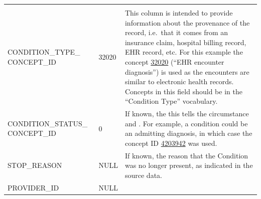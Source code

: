 \documentclass[11pt]{book}
\theoremstyle{definition}
\theoremstyle{definition}
\theoremstyle{definition}
\theoremstyle{remark}
\begin{document}
\begin{longtable}[]{@{}lll@{}}
\begin{minipage}[t]{0.49\columnwidth}
\end{minipage}\tabularnewline
\begin{minipage}[t]{0.28\columnwidth}\raggedright
CONDITION\_TYPE\_ CONCEPT\_ID\strut
\end{minipage} & \begin{minipage}[t]{0.15\columnwidth}\raggedright
32020\strut
\end{minipage} & \begin{minipage}[t]{0.49\columnwidth}\raggedright
This column is intended to provide information about the provenance of the record, i.e.~that it comes from an insurance claim, hospital billing record, EHR record, etc. For this example the concept \href{http://athena.ohdsi.org/search-terms/terms/32020}{32020} (``EHR encounter diagnosis'') is used as the encounters are similar to electronic health records. Concepts in this field should be in the ``Condition Type'' vocabulary.\strut
\end{minipage}\tabularnewline
\begin{minipage}[t]{0.28\columnwidth}\raggedright
CONDITION\_STATUS\_ CONCEPT\_ID\strut
\end{minipage} & \begin{minipage}[t]{0.15\columnwidth}\raggedright
0\strut
\end{minipage} & \begin{minipage}[t]{0.49\columnwidth}\raggedright
If known, the this tells the circumstance and . For example, a condition could be an admitting diagnosis, in which case the concept ID \href{http://athena.ohdsi.org/search-terms/terms/4203942}{4203942} was used.\strut
\end{minipage}\tabularnewline
\begin{minipage}[t]{0.28\columnwidth}\raggedright
STOP\_REASON\strut
\end{minipage} & \begin{minipage}[t]{0.15\columnwidth}\raggedright
NULL\strut
\end{minipage} & \begin{minipage}[t]{0.49\columnwidth}\raggedright
If known, the reason that the Condition was no longer present, as indicated in the source data.\strut
\end{minipage}\tabularnewline
\begin{minipage}[t]{0.28\columnwidth}\raggedright
PROVIDER\_ID\strut
\end{minipage} & \begin{minipage}[t]{0.15\columnwidth}\raggedright
NULL\strut
\end{minipage} & \begin{minipage}[t]{0.49\columnwidth}\raggedright

\end{minipage}
\end{longtable}
\end{document}

